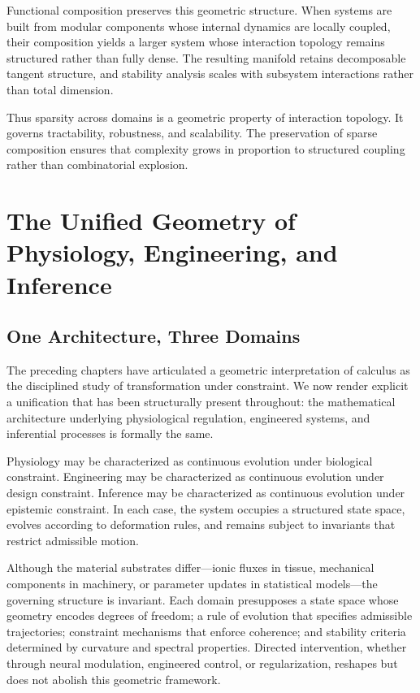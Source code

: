 \documentclass[12pt]{book}
\begin{document}
Functional composition preserves this geometric structure. When systems are built from modular components whose internal dynamics are locally coupled, their composition yields a larger system whose interaction topology remains structured rather than fully dense. The resulting manifold retains decomposable tangent structure, and stability analysis scales with subsystem interactions rather than total dimension.

Thus sparsity across domains is a geometric property of interaction topology. It governs tractability, robustness, and scalability. The preservation of sparse composition ensures that complexity grows in proportion to structured coupling rather than combinatorial explosion.

\chapter{The Unified Geometry of Physiology, Engineering, and Inference}

\section{One Architecture, Three Domains}

The preceding chapters have articulated a geometric interpretation of calculus as the disciplined study of transformation under constraint. We now render explicit a unification that has been structurally present throughout: the mathematical architecture underlying physiological regulation, engineered systems, and inferential processes is formally the same.

Physiology may be characterized as continuous evolution under biological constraint. Engineering may be characterized as continuous evolution under design constraint. Inference may be characterized as continuous evolution under epistemic constraint. In each case, the system occupies a structured state space, evolves according to deformation rules, and remains subject to invariants that restrict admissible motion.

Although the material substrates differ---ionic fluxes in tissue, mechanical components in machinery, or parameter updates in statistical models---the governing structure is invariant. Each domain presupposes a state space whose geometry encodes degrees of freedom; a rule of evolution that specifies admissible trajectories; constraint mechanisms that enforce coherence; and stability criteria determined by curvature and spectral properties. Directed intervention, whether through neural modulation, engineered control, or regularization, reshapes but does not abolish this geometric framework.
\end{document}

